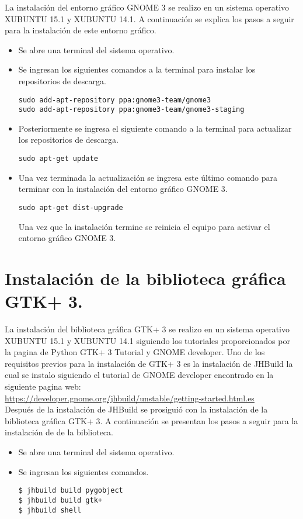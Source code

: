 La instalación del entorno gráfico GNOME 3 se realizo en un sistema operativo XUBUNTU 15.1 y XUBUNTU 14.1. A continuación se explica los pasos a seguir para la instalación de este entorno gráfico.
\begin{itemize}
\item Se abre una terminal del sistema operativo.
\item Se ingresan los siguientes comandos a la terminal para instalar los repositorios de descarga.
\begin{lstlisting}
sudo add-apt-repository ppa:gnome3-team/gnome3
sudo add-apt-repository ppa:gnome3-team/gnome3-staging
\end{lstlisting}

\item Posteriormente se ingresa el siguiente comando a la terminal para actualizar los repositorios de descarga.
\begin{lstlisting}
sudo apt-get update
\end{lstlisting}

\item Una vez terminada la actualización se  ingresa este último comando para terminar con la instalación del entorno gráfico GNOME 3.
\begin{lstlisting}
sudo apt-get dist-upgrade
\end{lstlisting}
Una vez que la instalación termine se reinicia el equipo para activar el entorno gráfico GNOME 3.

\end{itemize}
\pagebreak
\section{Instalación de la biblioteca gráfica GTK+ 3.}

La instalación del biblioteca gráfica GTK+ 3 se realizo en un sistema operativo XUBUNTU 15.1 y XUBUNTU 14.1 siguiendo  los tutoriales proporcionados por la pagina de Python GTK+ 3 Tutorial y GNOME developer.
Uno de los requisitos previos para la instalación de GTK+ 3 es la instalación de JHBuild la cual se instalo siguiendo el tutorial de GNOME developer encontrado en la siguiente pagina web:\\
\url{https://developer.gnome.org/jhbuild/unstable/getting-started.html.es}\\

Después de la instalación de JHBuild se prosiguió con la instalación de la biblioteca gráfica GTK+ 3. A continuación se presentan los pasos a seguir para la instalación de de la biblioteca.
\begin{itemize}
\item Se abre una terminal del sistema operativo.
\item Se ingresan los siguientes comandos.
\begin{lstlisting}
$ jhbuild build pygobject
$ jhbuild build gtk+
$ jhbuild shell
\end{lstlisting}
\end{itemize}

